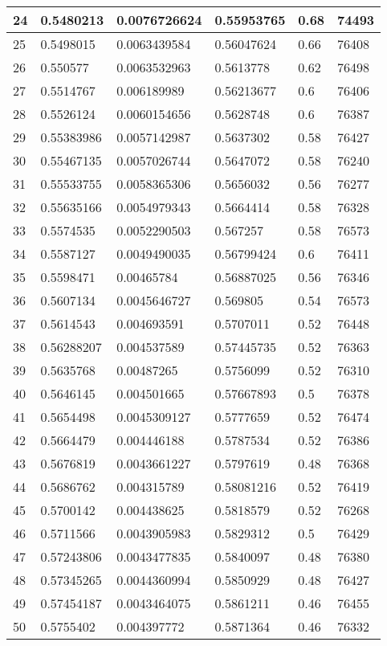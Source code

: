 \begin{longtable}{|l|l|l|l|l|l|}
24 & 0.5480213 & 0.0076726624 & 0.55953765 & 0.68 & 74493 \\ \hline 
25 & 0.5498015 & 0.0063439584 & 0.56047624 & 0.66 & 76408 \\ \hline 
26 & 0.550577 & 0.0063532963 & 0.5613778 & 0.62 & 76498 \\ \hline 
27 & 0.5514767 & 0.006189989 & 0.56213677 & 0.6 & 76406 \\ \hline 
28 & 0.5526124 & 0.0060154656 & 0.5628748 & 0.6 & 76387 \\ \hline 
29 & 0.55383986 & 0.0057142987 & 0.5637302 & 0.58 & 76427 \\ \hline 
30 & 0.55467135 & 0.0057026744 & 0.5647072 & 0.58 & 76240 \\ \hline 
31 & 0.55533755 & 0.0058365306 & 0.5656032 & 0.56 & 76277 \\ \hline 
32 & 0.55635166 & 0.0054979343 & 0.5664414 & 0.58 & 76328 \\ \hline 
33 & 0.5574535 & 0.0052290503 & 0.567257 & 0.58 & 76573 \\ \hline 
34 & 0.5587127 & 0.0049490035 & 0.56799424 & 0.6 & 76411 \\ \hline 
35 & 0.5598471 & 0.00465784 & 0.56887025 & 0.56 & 76346 \\ \hline 
36 & 0.5607134 & 0.0045646727 & 0.569805 & 0.54 & 76573 \\ \hline 
37 & 0.5614543 & 0.004693591 & 0.5707011 & 0.52 & 76448 \\ \hline 
38 & 0.56288207 & 0.004537589 & 0.57445735 & 0.52 & 76363 \\ \hline 
39 & 0.5635768 & 0.00487265 & 0.5756099 & 0.52 & 76310 \\ \hline 
40 & 0.5646145 & 0.004501665 & 0.57667893 & 0.5 & 76378 \\ \hline 
41 & 0.5654498 & 0.0045309127 & 0.5777659 & 0.52 & 76474 \\ \hline 
42 & 0.5664479 & 0.004446188 & 0.5787534 & 0.52 & 76386 \\ \hline 
43 & 0.5676819 & 0.0043661227 & 0.5797619 & 0.48 & 76368 \\ \hline 
44 & 0.5686762 & 0.004315789 & 0.58081216 & 0.52 & 76419 \\ \hline 
45 & 0.5700142 & 0.004438625 & 0.5818579 & 0.52 & 76268 \\ \hline 
46 & 0.5711566 & 0.0043905983 & 0.5829312 & 0.5 & 76429 \\ \hline 
47 & 0.57243806 & 0.0043477835 & 0.5840097 & 0.48 & 76380 \\ \hline 
48 & 0.57345265 & 0.0044360994 & 0.5850929 & 0.48 & 76427 \\ \hline 
49 & 0.57454187 & 0.0043464075 & 0.5861211 & 0.46 & 76455 \\ \hline 
50 & 0.5755402 & 0.004397772 & 0.5871364 & 0.46 & 76332 \\ \hline 
\end{longtable}
